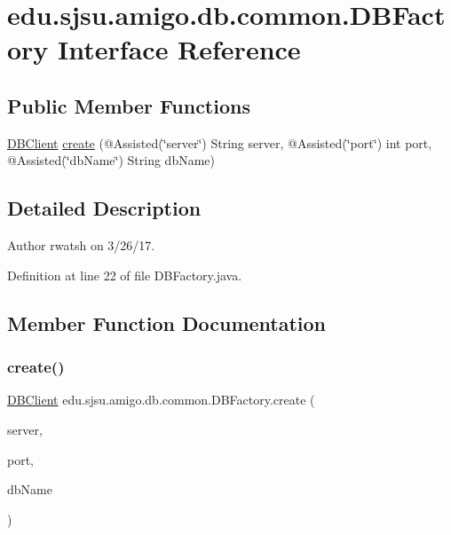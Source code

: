 \hypertarget{interfaceedu_1_1sjsu_1_1amigo_1_1db_1_1common_1_1_d_b_factory}{}\section{edu.\+sjsu.\+amigo.\+db.\+common.\+D\+B\+Factory Interface Reference}
\label{interfaceedu_1_1sjsu_1_1amigo_1_1db_1_1common_1_1_d_b_factory}
\subsection*{Public Member Functions}
\begin{DoxyCompactItemize}
\item 
\hyperlink{interfaceedu_1_1sjsu_1_1amigo_1_1db_1_1common_1_1_d_b_client}{D\+B\+Client} \hyperlink{interfaceedu_1_1sjsu_1_1amigo_1_1db_1_1common_1_1_d_b_factory_a86815a2257b6a72a4e356257d84de596}{create} (@Assisted(\char`\"{}server\char`\"{}) String server, @Assisted(\char`\"{}port\char`\"{}) int port, @Assisted(\char`\"{}db\+Name\char`\"{}) String db\+Name)
\end{DoxyCompactItemize}


\subsection{Detailed Description}
\begin{DoxyAuthor}{Author}
rwatsh on 3/26/17. 
\end{DoxyAuthor}


Definition at line 22 of file D\+B\+Factory.\+java.



\subsection{Member Function Documentation}
\mbox{\label{interfaceedu_1_1sjsu_1_1amigo_1_1db_1_1common_1_1_d_b_factory_a86815a2257b6a72a4e356257d84de596}} 
\subsubsection{\texorpdfstring{create()}{create()}}
{\footnotesize\ttfamily \hyperlink{interfaceedu_1_1sjsu_1_1amigo_1_1db_1_1common_1_1_d_b_client}{D\+B\+Client} edu.\+sjsu.\+amigo.\+db.\+common.\+D\+B\+Factory.\+create (\begin{DoxyParamCaption}\item[{@Assisted(\char`\"{}server\char`\"{}) String}]{server,  }\item[{@Assisted(\char`\"{}port\char`\"{}) int}]{port,  }\item[{@Assisted(\char`\"{}db\+Name\char`\"{}) String}]{db\+Name }\end{DoxyParamCaption})}



